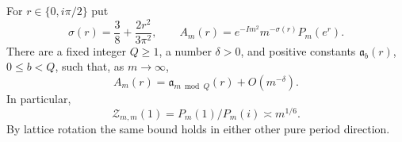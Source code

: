 \begin{auxproposition}
For $r\in\{0,i\pi/2\}$ put
\[
 \sigma(r)=\frac38+\frac{2r^2}{3\pi^2},\qquad
 A_m(r)=e^{-Im^2}m^{-\sigma(r)}P_m(e^r).
\]
There are a fixed integer $Q\ge1$, a number $\delta>0$, and positive constants $\mathfrak a_b(r)$, $0\le b<Q$, such that, as $m\to\infty$,
\begin{equation}\label{eq:classwise-normalization}
 A_m(r)=\mathfrak a_{m\bmod Q}(r)+O(m^{-\delta}).
\end{equation}
In particular,
\begin{equation}\label{eq:uniform-cylinder-normalization}
 \mathcal Z_{m,m}(1)=P_m(1)/P_m(i)\asymp m^{1/6}.
\end{equation}
By lattice rotation the same bound holds in either other pure period direction.
\end{auxproposition}
